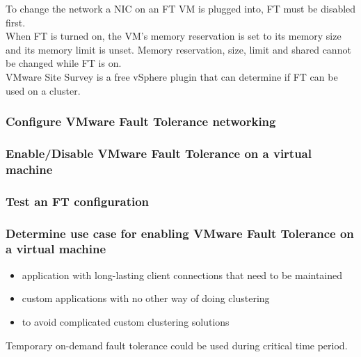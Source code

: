 To change the network a NIC on an FT VM is plugged into, FT must be disabled
first.\\

When FT is turned on, the VM's memory reservation is set to its memory size
and its memory limit is unset. Memory reservation, size, limit and shared
cannot be changed while FT is on.\\

VMware Site Survey is a free vSphere plugin that can determine if FT can be
used on a cluster.

\subsubsection{Configure VMware Fault Tolerance networking}

\subsubsection{Enable/Disable VMware Fault Tolerance on a virtual machine}

\subsubsection{Test an FT configuration}

\subsubsection{Determine use case for enabling VMware Fault Tolerance on a virtual machine}

\begin{itemize}

\item application with long-lasting client connections that need to be
maintained

\item custom applications with no other way of doing clustering

\item to avoid complicated custom clustering solutions

\end{itemize}

Temporary on-demand fault tolerance could be used during critical time period.

